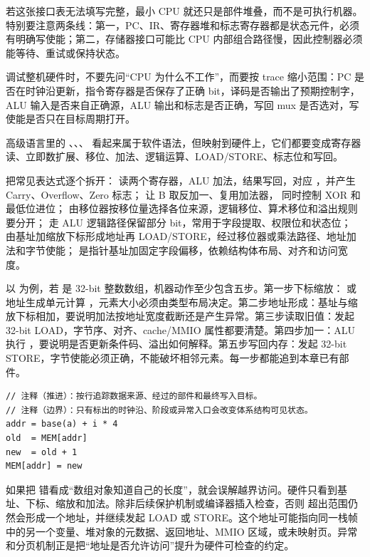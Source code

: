 若这张接口表无法填写完整，最小 CPU 就还只是部件堆叠，而不是可执行机器。特别要注意两条线：第一，PC、IR、寄存器堆和标志寄存器都是状态元件，必须有明确写使能；第二，存储器接口可能比 CPU 内部组合路径慢，因此控制器必须能等待、重试或保持状态。

调试整机硬件时，不要先问“CPU 为什么不工作”，而要按 trace 缩小范围：PC 是否在时钟沿更新，指令寄存器是否保存了正确 bit，译码是否输出了预期控制字，ALU 输入是否来自正确源，ALU 输出和标志是否正确，写回 mux 是否选对，写使能是否只在目标周期打开。

高级语言里的 、、、 看起来属于软件语法，但映射到硬件上，它们都要变成寄存器读、立即数扩展、移位、加法、逻辑运算、LOAD/STORE、标志位和写回。

把常见表达式逐个拆开： 读两个寄存器，ALU 加法，结果写回，对应 ，并产生 Carry、Overflow、Zero 标志； 让 B 取反加一、复用加法器， 同时控制 XOR 和最低位进位； 由移位器按移位量选择各位来源，逻辑移位、算术移位和溢出规则要分开； 走 ALU 逻辑路径保留部分 bit，常用于字段提取、权限位和状态位； 由基址加缩放下标形成地址再 LOAD/STORE，经过移位器或乘法路径、地址加法和字节使能； 是指针基址加固定字段偏移，依赖结构体布局、对齐和访问宽度。

以  为例，若  是 32-bit 整数数组，机器动作至少包含五步。第一步下标缩放： 或地址生成单元计算 ，元素大小必须由类型布局决定。第二步地址形成：基址与缩放下标相加，要说明加法按地址宽度截断还是产生异常。第三步读取旧值：发起 32-bit LOAD，字节序、对齐、cache/MMIO 属性都要清楚。第四步加一：ALU 执行 ，要说明是否更新条件码、溢出如何解释。第五步写回内存：发起 32-bit STORE，字节使能必须正确，不能破坏相邻元素。每一步都能追到本章已有部件。

\begin{lstlisting}
// 注释（推进）：按行追踪数据来源、经过的部件和最终写入目标。
// 注释（边界）：只有标出的时钟沿、阶段或异常入口会改变体系结构可见状态。
addr = base(a) + i * 4
old  = MEM[addr]
new  = old + 1
MEM[addr] = new
\end{lstlisting}

如果把  错看成“数组对象知道自己的长度”，就会误解越界访问。硬件只看到基址、下标、缩放和加法。除非后续保护机制或编译器插入检查，否则  超出范围仍然会形成一个地址，并继续发起 LOAD 或 STORE。这个地址可能指向同一栈帧中的另一个变量、堆对象的元数据、返回地址、MMIO 区域，或未映射页。异常和分页机制正是把“地址是否允许访问”提升为硬件可检查的约定。

